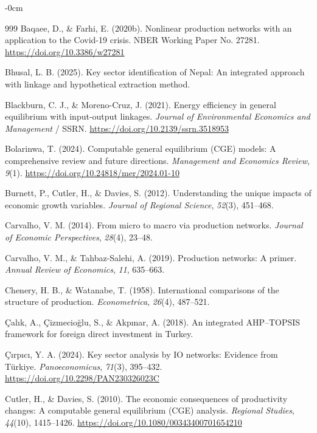 \documentclass[journal,article,submit,pdftex,moreauthors]{Definitions/mdpi}
\begin{document}
\begin{adjustwidth}{-\extralength}{0cm}
{\begin{thebibliography}{999}
Baqaee, D., \& Farhi, E. (2020b). Nonlinear production networks with an application to the Covid-19 crisis. NBER Working Paper No. 27281. \url{https://doi.org/10.3386/w27281}

Bhusal, L. B. (2025). Key sector identification of Nepal: An integrated approach with linkage and hypothetical extraction method.

Blackburn, C. J., \& Moreno-Cruz, J. (2021). Energy efficiency in general equilibrium with input-output linkages. \textit{Journal of Environmental Economics and Management} / SSRN. \url{https://doi.org/10.2139/ssrn.3518953}

Bolarinwa, T. (2024). Computable general equilibrium (CGE) models: A comprehensive review and future directions. \textit{Management and Economics Review}, \textit{9}(1). \url{https://doi.org/10.24818/mer/2024.01-10}

Burnett, P., Cutler, H., \& Davies, S. (2012). Understanding the unique impacts of economic growth variables. \textit{Journal of Regional Science}, \textit{52}(3), 451--468.

Carvalho, V. M. (2014). From micro to macro via production networks. \textit{Journal of Economic Perspectives}, \textit{28}(4), 23--48.

Carvalho, V. M., \& Tahbaz-Salehi, A. (2019). Production networks: A primer. \textit{Annual Review of Economics}, \textit{11}, 635--663.

Chenery, H. B., \& Watanabe, T. (1958). International comparisons of the structure of production. \textit{Econometrica}, \textit{26}(4), 487--521.

Çalık, A., Çizmecioğlu, S., \& Akpınar, A. (2018). An integrated AHP--TOPSIS framework for foreign direct investment in Turkey.

Çırpıcı, Y. A. (2024). Key sector analysis by IO networks: Evidence from Türkiye. \textit{Panoeconomicus}, \textit{71}(3), 395--432. \url{https://doi.org/10.2298/PAN230326023C}

Cutler, H., \& Davies, S. (2010). The economic consequences of productivity changes: A computable general equilibrium (CGE) analysis. \textit{Regional Studies}, \textit{44}(10), 1415--1426. \url{https://doi.org/10.1080/00343400701654210}


\end{thebibliography}}
\end{adjustwidth}
\end{document}
